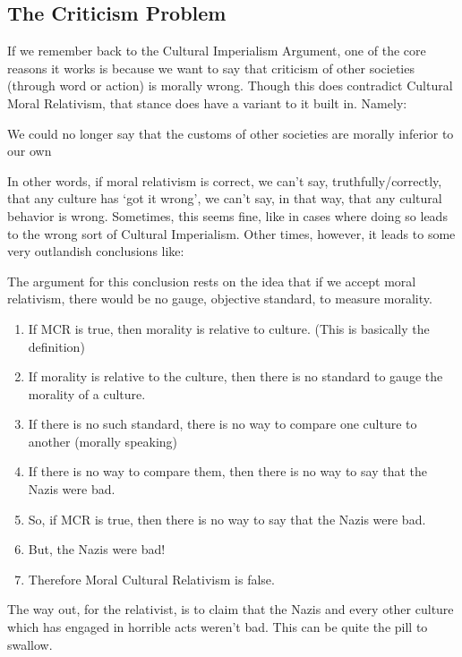 \subsection{The Criticism Problem}

If we remember back to the Cultural Imperialism Argument, one of the core reasons it works is because we want to say that criticism of other societies (through word or action) is morally wrong. Though this does contradict Cultural Moral Relativism, that stance does have a variant to it built in. Namely:
\begin{center}
We could no longer say that the customs of other societies are morally inferior to our own
\end{center}
In other words, if moral relativism is correct, we can't say, truthfully/correctly, that any culture has `got it wrong', we can't say, in that way, that any cultural behavior is wrong. Sometimes, this seems fine, like in cases where doing so leads to the wrong sort of Cultural Imperialism. Other times, however, it leads to some very outlandish conclusions like:

The argument for this conclusion rests on the idea that if we accept moral relativism, there would be no gauge, objective standard, to measure morality.
\begin{enumerate}
    \item If MCR is true, then morality is relative to culture. (This is basically the definition)
    \item If morality is relative to the culture, then there is no standard to gauge the morality of a culture.
    \item If there is no such standard, there is no way to compare one culture to another (morally speaking)
    \item If there is no way to compare them, then there is no way to say that the Nazis were bad.
    \item So, if MCR is true, then there is no way to say that the Nazis were bad.
    \item But, the Nazis were bad!
    \item Therefore Moral Cultural Relativism is false.
\end{enumerate}
The way out, for the relativist, is to claim that the Nazis and every other culture which has engaged in horrible acts weren't bad. This can be quite the pill to swallow. 

